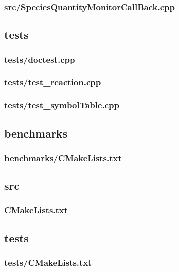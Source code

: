 \subsubsection{src/SpeciesQuantityMonitorCallBack.cpp} \label{subsec:QuantityCallBack}

\newpage
\subsection{tests}
\subsubsection{tests/doctest.cpp}

\newpage
\subsubsection{tests/test\_reaction.cpp}

\newpage
\subsubsection{tests/test\_symbolTable.cpp}

\newpage
\subsection{benchmarks}
\subsubsection{benchmarks/CMakeLists.txt}

\newpage
\subsection{src}
\subsubsection{CMakeLists.txt} \label{subsec:rootCmake}

\newpage
\subsection{tests}
\subsubsection{tests/CMakeLists.txt}

